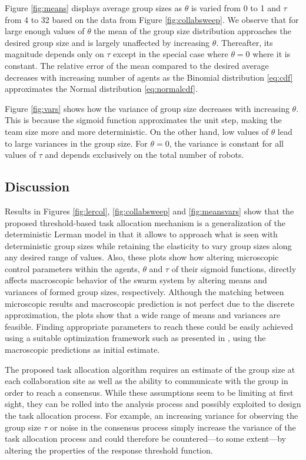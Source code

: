 \documentclass[Main.tex]{subfiles}
\begin{document}
Figure \ref{fig:means} displays average group sizes as $\theta$ is varied from 0 to 1 and $\tau$ from 4 to 32 based on the data from Figure \ref{fig:collabsweep}. We observe that for large enough values of $\theta$ the mean of the group size distribution approaches the desired group size and is largely unaffected by increasing $\theta$. Thereafter, its magnitude depends only on $\tau$ except in the special case where $\theta = 0$ where it is constant. The relative error of the mean compared to the desired average decreases with increasing number of agents as the  Binomial distribution \eqref{eq:cdf}
approximates the Normal distribution \eqref{eq:normalcdf}.

Figure \ref{fig:vars} shows how the variance of group size decreases with increasing $\theta$. This is because the sigmoid function approximates the unit step, making the team size more and more deterministic. On the other hand, low values of $\theta$ lead to large variances in the group size. For $\theta=0$, the variance is constant for all values of $\tau$ and depends exclusively on the total number of robots. 



\subsection*{Discussion}\label{sec:discussion}
Results in Figures \ref{fig:lercol}, \ref{fig:collabsweep} and \ref{fig:meansvars} show that the proposed threshold-based task allocation mechanism is a generalization of the deterministic Lerman model in that it allows to approach what is seen with deterministic group sizes while retaining the elasticity to vary group sizes along any desired range of values. Also, these plots show how altering microscopic control parameters within the agents, $\theta$ and $\tau$ of their sigmoid functions, directly affects macroscopic behavior of the swarm system by altering means and variances of formed group sizes, respectively. Although the matching between microscopic results and macroscopic prediction is not perfect due to the discrete approximation, the plots show that a wide range of means and variances are feasible. Finding appropriate parameters to reach these could be easily achieved using a suitable optimization framework such as presented in \cite{Correll2008,Berman2009}, using the macroscopic predictions as initial estimate. 

The proposed task allocation algorithm requires an estimate of the group size at each collaboration site as well as the ability to communicate with the group in order to reach a consensus. While these assumptions seem to be limiting at first sight, they can be rolled into the analysis process and possibly exploited to design the task allocation process. For example, an increasing variance for observing the group size $\tau$ or noise in the consensus process simply increase the variance of the task allocation process and could therefore be countered---to some extent---by altering the properties of the response threshold function. 
\end{document}

